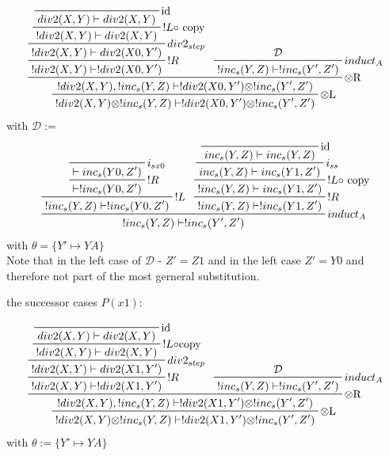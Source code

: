 \documentclass[sigconf]{acmart}
\begin{document}
\begin{eqnarray}
  \prftree[r]{$\otimes$L}
  {
    \prftree[r]{$\otimes$R}
    {
      \prftree[r]{$!R$}
      {
        \prftree[r] {$div2_{step}$}
        {
          \prftree[r] {$!L\circ$ copy}
          {
            \prftree[r] {id}
            { div2(X,Y)\vdash div2(X, Y) }
          }
          { !div2(X,Y)\vdash div2(X, Y) }
        }
        { !div2(X,Y)\vdash div2(X0, Y') }
      }
      { !div2(X,Y)\vdash !div2(X0, Y') }
    }
    {
      \prftree[r] {$induct_A$}
      {
        \mathcal{D}
      }
      { !inc_s(Y, Z)\vdash !inc_s(Y', Z') }
    }
    { !div2(X,Y), !inc_s(Y, Z)\vdash !div2(X0, Y')\otimes !inc_s(Y', Z') }
  }
  {!div2(X,Y)\otimes !inc_s(Y, Z)\vdash !div2(X0, Y')\otimes !inc_s(Y', Z')}
\end{eqnarray}
with $\mathcal{D} :=$
\begin{eqnarray}
  \prftree[r]{$induct_A$}
  {
    \prftree[r]{$!L$}
    {
      \prftree[r]{$!R$}
      {
        \prftree[r]{$i_{sx0}$}
        { \vdash inc_s(Y0, Z') }
      }
      { \vdash !inc_s(Y0, Z') }
    }
    { !inc_s(Y,Z)\vdash !inc_s(Y0, Z') }
  }
  {
    \prftree[r]{$!R$}
    {
      \prftree[r]{$!L\circ$ copy}
      {
        \prftree[r]{$i_{ss}$}
        {
          \prftree[r]{id}
          { inc_s(Y,Z)\vdash inc_s(Y, Z ) }
        }
        { inc_s(Y,Z)\vdash inc_s(Y1, Z') }
      }
      { !inc_s(Y,Z)\vdash inc_s(Y1, Z') }
    }
    { !inc_s(Y,Z)\vdash !inc_s(Y1, Z') }
  }
  {!inc_s(Y, Z)\vdash !inc_s(Y', Z')}
\end{eqnarray}
with $\theta = \{Y' \mapsto YA\}$\\
Note that in the left case of $\mathcal{D}$ - $Z' = Z1$ and in the left case $Z' = Y0$ and therefore not part of the most gerneral substitution.


the successor cases $P(x1)$:

\begin{eqnarray}
  \prftree[r]{$\otimes$L}
  {
    \prftree[r]{$\otimes$R}
    {
      \prftree[r]{$!R$}
      {
        \prftree[r]{$div2_{step}$}
        {
          \prftree[r]{$!L\circ$copy}
          {
            \prftree[r]{id}
            {
              div2(X,Y) \vdash div2(X, Y)
            }
          }
          {
            !div2(X,Y) \vdash div2(X, Y)
          }
        }
        {
          !div2(X,Y) \vdash div2(X1, Y')
        }
      }
      {
        !div2(X,Y) \vdash !div2(X1, Y')
      }
    }
    {
      \prftree[r]{$induct_A$}
      {\mathcal{D}}
      {
        !inc_s(Y,Z)\vdash !inc_s(Y', Z')
      }
    }
    { !div2(X,Y), !inc_s(Y,Z)\vdash !div2(X1, Y')\otimes !inc_s(Y', Z') }
  }
  {!div2(X,Y)\otimes !inc_s(Y,Z)\vdash !div2(X1, Y')\otimes !inc_s(Y', Z')}
\end{eqnarray}
with $\theta := \{Y' \mapsto YA\}$
\end{document}
